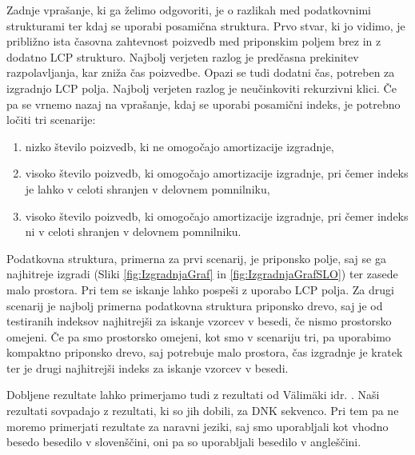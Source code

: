 Zadnje vprašanje, ki ga želimo odgovoriti, je o razlikah med podatkovnimi strukturami ter kdaj se uporabi posamična struktura. Prvo stvar, ki jo vidimo, je približno ista časovna zahtevnost poizvedb med priponskim poljem brez in z dodatno LCP strukturo. Najbolj verjeten razlog je predčasna prekinitev razpolavljanja, kar zniža čas poizvedbe. Opazi se tudi dodatni čas, potreben za izgradnjo LCP polja. Najbolj verjeten razlog je neučinkoviti rekurzivni klici. Če pa se vrnemo nazaj na vprašanje, kdaj se uporabi posamični indeks, je potrebno ločiti tri scenarije: 
\begin{enumerate}
        \item nizko število poizvedb, ki ne omogočajo amortizacije izgradnje,
        \item visoko število poizvedb, ki omogočajo amortizacije izgradnje, pri čemer indeks je lahko v celoti shranjen v delovnem pomnilniku,
        \item visoko število poizvedb, ki omogočajo amortizacije izgradnje, pri čemer indeks ni v celoti shranjen v delovnem pomnilniku.
\end{enumerate} 
Podatkovna struktura, primerna za prvi scenarij, je priponsko polje, saj se ga najhitreje izgradi (Sliki \ref{fig:IzgradnjaGraf} in \ref{fig:IzgradnjaGrafSLO}) ter zasede malo prostora. Pri tem se iskanje lahko pospeši z uporabo LCP polja. Za drugi scenarij je najbolj primerna podatkovna struktura priponsko drevo, saj je od testiranih indeksov najhitrejši za iskanje vzorcev v besedi, če nismo prostorsko omejeni. Če pa smo prostorsko omejeni, kot smo v scenariju tri, pa uporabimo kompaktno priponsko drevo, saj potrebuje malo prostora, čas izgradnje je kratek ter je drugi najhitrejši indeks za iskanje vzorcev v besedi.

Dobljene rezultate lahko primerjamo tudi z rezultati od Välimäki idr. \cite{Valimaki2007}. Naši rezultati sovpadajo z rezultati, ki so jih dobili, za DNK sekvenco. Pri tem pa ne moremo primerjati rezultate za naravni jeziki, saj smo uporabljali kot vhodno besedo besedilo v slovenščini, oni pa so uporabljali besedilo v angleščini.